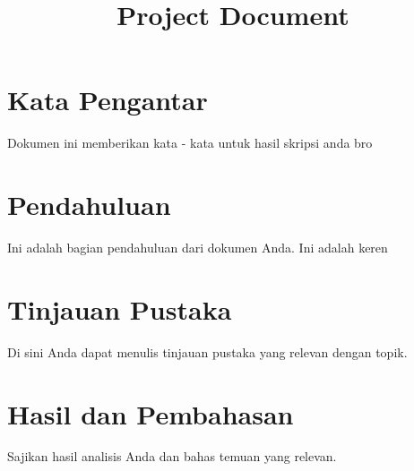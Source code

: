 \documentclass{article}
\begin{document}
\title{Project Document}



\maketitle



\section{Kata Pengantar}

Dokumen ini memberikan kata - kata untuk hasil skripsi anda bro











\section{Pendahuluan}

Ini adalah bagian pendahuluan dari dokumen Anda. Ini adalah keren

\section{Tinjauan Pustaka}

Di sini Anda dapat menulis tinjauan pustaka yang relevan dengan topik.









\section{Hasil dan Pembahasan}

Sajikan hasil analisis Anda dan bahas temuan yang relevan. 
\end{document}
